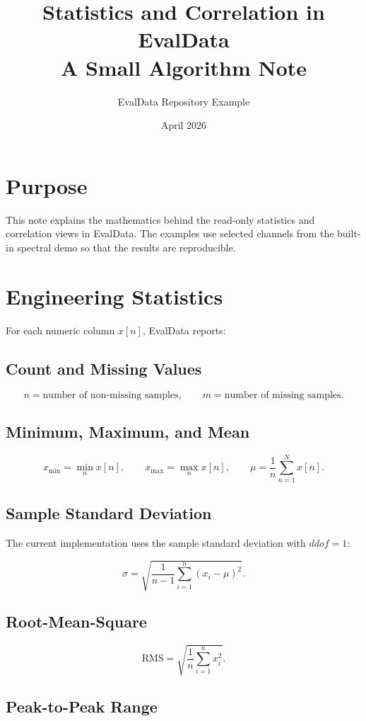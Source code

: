 \documentclass[11pt,a4paper]{article}
\title{Statistics and Correlation in EvalData\\A Small Algorithm Note}
\author{EvalData Repository Example}
\date{April 2026}
\begin{document}
\maketitle

\section{Purpose}

This note explains the mathematics behind the read-only statistics and correlation views in EvalData. The examples use selected channels from the built-in spectral demo so that the results are reproducible.

\section{Engineering Statistics}

For each numeric column $x[n]$, EvalData reports:

\subsection{Count and Missing Values}

\[
n = \text{number of non-missing samples}, \qquad m = \text{number of missing samples}.
\]

\subsection{Minimum, Maximum, and Mean}

\[
x_{\min} = \min_n x[n], \qquad x_{\max} = \max_n x[n], \qquad \mu = \frac{1}{n} \sum_{n=1}^{N} x[n].
\]

\subsection{Sample Standard Deviation}

The current implementation uses the sample standard deviation with $ddof=1$:

\[
\sigma = \sqrt{\frac{1}{n-1} \sum_{i=1}^{n} (x_i - \mu)^2}.
\]

\subsection{Root-Mean-Square}

\[
\mathrm{RMS} = \sqrt{\frac{1}{n} \sum_{i=1}^{n} x_i^2}.
\]

\subsection{Peak-to-Peak Range}
\end{document}
